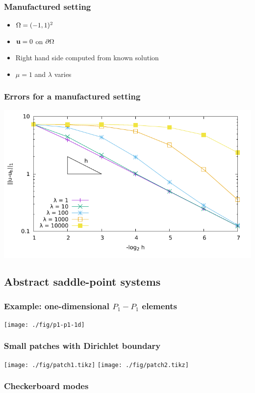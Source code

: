 \documentclass[american,ignorenonframetext,notheorems]{beamer}
\begin{document}
\begin{frame}
  \frametitle{Manufactured setting}
  \begin{itemize}
  \item $\Omega = (-1,1)^2$
  \item $\mathbf u = 0$ on $\partial\Omega$
  \item Right hand side computed from known solution
  \item $\mu=1$ and $\lambda$ varies
  \end{itemize}
\end{frame}

\begin{frame}
  \frametitle{Errors for a manufactured setting}
  \centering
  \includegraphics[width=.8\textwidth]{./graph/elasticity/locking}
\end{frame}

\subsection{Abstract saddle-point systems}

\begin{frame}
  \frametitle{Example: one-dimensional $P_1-P_1$ elements}
  \begin{center}
      \texttt{[image: ./fig/p1-p1-1d]}
  \end{center}
\end{frame}

\begin{frame}
  \frametitle{Small patches with Dirichlet boundary}
  \begin{center}
    \hfill
    \texttt{[image: ./fig/patch1.tikz]}
    \hfill
    \texttt{[image: ./fig/patch2.tikz]}
    \hfill\mbox{}
  \end{center}
\end{frame}

\begin{frame}
  \frametitle{Checkerboard modes}
  
\end{frame}
\end{document}
